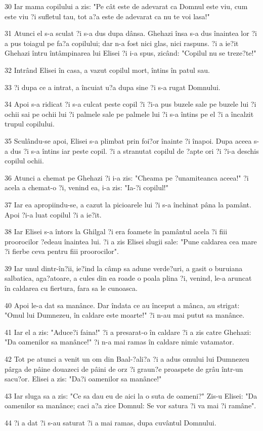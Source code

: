 \par 30 Iar mama copilului a zis: "Pe cât este de adevarat ca Domnul este viu, cum este viu ?i sufletul tau, tot a?a este de adevarat ca nu te voi lasa!"
\par 31 Atunci el s-a sculat ?i s-a dus dupa dânsa. Ghehazi însa s-a dus înaintea lor ?i a pus toiagul pe fa?a copilului; dar n-a fost nici glas, nici raspuns. ?i a ie?it Ghehazi întru întâmpinarea lui Elisei ?i i-a spus, zicând: "Copilul nu se treze?te!"
\par 32 Intrând Elisei în casa, a vazut copilul mort, întins în patul sau.
\par 33 ?i dupa ce a intrat, a încuiat u?a dupa sine ?i s-a rugat Domnului.
\par 34 Apoi s-a ridicat ?i s-a culcat peste copil ?i ?i-a pus buzele sale pe buzele lui ?i ochii sai pe ochii lui ?i palmele sale pe palmele lui ?i s-a întins pe el ?i a încalzit trupul copilului.
\par 35 Sculându-se apoi, Elisei s-a plimbat prin foi?or înainte ?i înapoi. Dupa aceea s-a dus ?i s-a întins iar peste copil. ?i a stranutat copilul de ?apte ori ?i ?i-a deschis copilul ochii.
\par 36 Atunci a chemat pe Ghehazi ?i i-a zis: "Cheama pe ?unamiteanca aceea!" ?i acela a chemat-o ?i, venind ea, i-a zis: "Ia-?i copilul!"
\par 37 Iar ea apropiindu-se, a cazut la picioarele lui ?i s-a închinat pâna la pamânt. Apoi ?i-a luat copilul ?i a ie?it.
\par 38 Iar Elisei s-a întors la Ghilgal ?i era foamete în pamântul acela ?i fiii proorocilor ?edeau înaintea lui. ?i a zis Elisei slugii sale: "Pune caldarea cea mare ?i fierbe ceva pentru fiii proorocilor".
\par 39 Iar unul dintr-în?ii, ie?ind la câmp sa adune verde?uri, a gasit o buruiana salbatica, aga?atoare, a cules din ea roade o poala plina ?i, venind, le-a aruncat în caldarea cu fiertura, fara sa le cunoasca.
\par 40 Apoi le-a dat sa manânce. Dar îndata ce au început a mânca, au strigat: "Omul lui Dumnezeu, în caldare este moarte!" ?i n-au mai putut sa manânce.
\par 41 Iar el a zis: "Aduce?i faina!" ?i a presarat-o în caldare ?i a zis catre Ghehazi: "Da oamenilor sa manânce!" ?i n-a mai ramas în caldare nimic vatamator.
\par 42 Tot pe atunci a venit un om din Baal-?ali?a ?i a adus omului lui Dumnezeu pârga de pâine douazeci de pâini de orz ?i graun?e proaspete de grâu într-un sacu?or. Elisei a zis: "Da?i oamenilor sa manânce!"
\par 43 Iar sluga sa a zis: "Ce sa dau eu de aici la o suta de oameni?" Zis-u Elisei: "Da oamenilor sa manânce; caci a?a zice Domnul: Se vor satura ?i va mai ?i ramâne".
\par 44 ?i a dat ?i s-au saturat ?i a mai ramas, dupa cuvântul Domnului.

